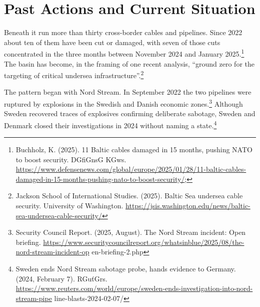 \section{Past Actions and Current Situation}


Beneath it run more than thirty cross-border cables and pipelines. Since 2022 about ten of them have been cut or damaged, with seven of those cuts concentrated in the three months between November 2024 and January 2025.\footnote{Buchholz, K. (2025). 11 Baltic cables damaged in 15 months, pushing NATO to boost security. DGfiGnsG KGws. \url{https://www.defensenews.com/global/europe/2025/01/28/11-baltic-cables-damaged-in-15-months-pushing-nato-to-boost-security/};} The basin has become, in the framing of one recent analysis, “ground zero for the targeting of critical undersea infrastructure”.\footnote{Jackson School of International Studies. (2025). Baltic Sea undersea cable security. University of Washington. \url{https://jsis.washington.edu/news/baltic-sea-undersea-cable-security/}}

The pattern began with Nord Stream. In September 2022 the two pipelines were ruptured by explosions in the Swedish and Danish economic zones.\footnote{Security Council Report. (2025, August). The Nord Stream incident: Open briefing. \url{https://www.securitycouncilreport.org/whatsinblue/2025/08/the-nord-stream-incident-op} en-briefing-2.php} Although Sweden recovered traces of explosives confirming deliberate sabotage, Sweden and Denmark closed their investigations in 2024 without naming a state.\footnote{Sweden ends Nord Stream sabotage probe, hands evidence to Germany. (2024, February 7). RGuťGrs. \url{https://www.reuters.com/world/europe/sweden-ends-investigation-into-nord-stream-pipe} line-blasts-2024-02-07/}

